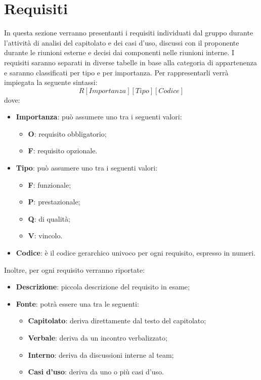 \documentclass[../AnalisiDeiRequisiti_v4.0.0.tex]{subfiles}
\begin{document}
\section{Requisiti}
In questa sezione verranno presentanti i requisiti individuati dal gruppo durante l'attività di analisi del capitolato e dei casi d'uso, discussi con il proponente durante le riunioni esterne e decisi dai componenti nelle riunioni interne. I requisiti saranno separati in diverse tabelle in base alla categoria di appartenenza e saranno classificati per tipo e per importanza. Per rappresentarli verrà impiegata la seguente sintassi:
\begin{equation*}
	R[Importanza][Tipo][Codice]
\end{equation*}
dove:
\begin{itemize}
	\item \textbf{Importanza}: può assumere uno tra i seguenti valori:
	\begin{itemize}
		\item \textbf{O}: requisito obbligatorio;
		\item \textbf{F}: requisito opzionale.
	\end{itemize}
	\item \textbf{Tipo}: può assumere uno tra i seguenti valori:
	\begin{itemize}
		\item \textbf{F}: funzionale;
		\item \textbf{P}: prestazionale;
		\item \textbf{Q}: di qualità;
		\item \textbf{V}: vincolo.
	\end{itemize}	
	\item \textbf{Codice}: è il codice gerarchico univoco per ogni requisito, espresso in numeri.
\end{itemize}
Inoltre, per ogni requisito verranno riportate:
\begin{itemize}
	\item \textbf{Descrizione}: piccola descrizione del requisito in esame;
	\item \textbf{Fonte}: potrà essere una tra le seguenti:
	\begin{itemize}
		\item \textbf{Capitolato}: deriva direttamente dal testo del capitolato; 
		\item \textbf{Verbale}: deriva da un incontro verbalizzato;
		\item \textbf{Interno}: deriva da discussioni interne al team;
		\item \textbf{Casi d'uso}: deriva da uno o più casi d'uso.
	\end{itemize}
\end{itemize}
	
\end{document}

